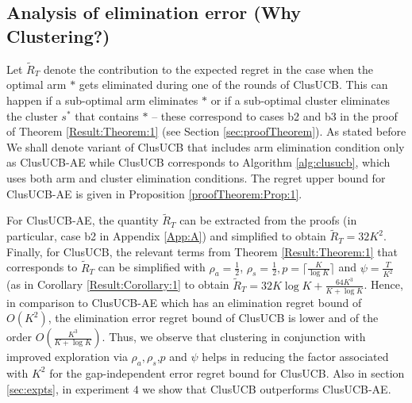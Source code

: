 

\subsection*{Analysis of elimination error (Why Clustering?)}
Let $\widetilde R_T$ denote the contribution  to the expected regret in the case when the optimal arm $*$ gets eliminated during one of the rounds of ClusUCB. This can happen if a sub-optimal arm eliminates $*$ or if a sub-optimal cluster eliminates the cluster $s^*$ that contains $*$ -- these correspond to cases b2 and b3 in the proof of Theorem \ref{Result:Theorem:1} (see Section \ref{sec:proofTheorem}). 
As stated before We shall denote variant of ClusUCB that includes arm elimination condition only as ClusUCB-AE while ClusUCB corresponds to Algorithm \ref{alg:clusucb}, which uses both arm and cluster elimination conditions. The regret upper bound for ClusUCB-AE is given in Proposition \ref{proofTheorem:Prop:1}.

For ClusUCB-AE, the quantity $\widetilde R_T$ can be extracted from the proofs (in particular, case b2 in Appendix \ref{App:A}) and simplified to obtain $\widetilde R_T = 32K^2 $. Finally, for ClusUCB, the relevant terms from Theorem \ref{Result:Theorem:1} that corresponds to $\widetilde R_T$ can be simplified with $\rho_{a}=\frac{1}{2}$, $\rho_{s}=\frac{1}{2},p=\big\lceil \frac{K}{\log K} \big\rceil$ and $\psi=\frac{T}{K^2}$ (as in Corollary \ref{Result:Corollary:1} to obtain  
$\tilde R_T = 32K\log K + \frac{64 K^3}{K+\log K}$. Hence, in comparison to ClusUCB-AE which has an elimination regret bound of $O(K^2)$, the elimination error regret bound of ClusUCB is lower and of the order $O\left(\frac{ K^3}{K+\log K}\right)$. Thus, we observe that clustering in conjunction with improved exploration via $\rho_{a},\rho_{s}$,$p$ and $\psi$ helps in reducing the factor associated with $K^2$ for the gap-independent error regret bound for ClusUCB. Also in section \ref{sec:expts}, in experiment $4$ we show that ClusUCB outperforms ClusUCB-AE. 



